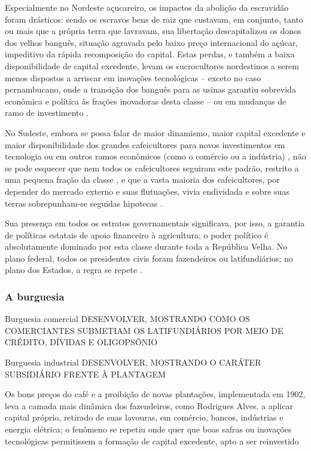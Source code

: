 Especialmente no Nordeste açucareiro, os impactos da abolição da escravidão foram drásticos: sendo os escravos bens de raiz que custavam, em conjunto, tanto ou mais que a própria terra que lavravam, sua libertação descapitalizou os donos dos velhos banguês, situação agravada pelo baixo preço internacional do açúcar, impeditivo da rápida recomposição do capital. Estas perdas, e também a baixa disponibilidade de capital excedente, levam os sucrocultores nordestinos a serem menos dispostos a arriscar em inovações tecnológicas -- exceto no caso pernambucano, onde a transição dos banguês para as usinas garantiu sobrevida econômica e política às frações inovadoras desta classe -- ou em mudanças de ramo de investimento \cite[p.~153]{CARONE1970inst}. 

No Sudeste, embora se possa falar de maior dinamismo, maior capital excedente e maior disponibilidade dos grandes cafeicultores para novos investimentos em tecnologia ou em outros ramos econômicos (como o comércio ou a indústria) \cite[p.~153-154]{CARONE1970inst}, não se pode esquecer que nem todos os cafeicultores seguiram este padrão, restrito a uma pequena fração da classe \cite[p.~32-38]{gorender_burguesia_1990}, e que a vasta maioria dos cafeicultores, por depender do mercado externo e suas flutuações, vivia endividada e sobre suas terras sobrepunham-se seguidas hipotecas \cite[p.~154]{CARONE1970inst}. 

Sua presença em todos os estratos governamentais significava, por isso, a garantia de políticas estatais de apoio financeiro à agricultura; o poder político é absolutamente dominado por esta classe durante toda a República Velha. No plano federal, todos os presidentes civis foram fazendeiros ou latifundiários; no plano dos Estados, a regra se repete \cite[p.~155]{CARONE1970inst}.

\subsubsection{A burguesia}\label{subsubsec:claburg}

Burguesia comercial DESENVOLVER, MOSTRANDO COMO OS COMERCIANTES SUBMETIAM OS LATIFUNDIÁRIOS POR MEIO DE CRÉDITO, DÍVIDAS E OLIGOPSÔNIO

Burguesia industrial DESENVOLVER, MOSTRANDO O CARÁTER SUBSIDIÁRIO FRENTE À PLANTAGEM

Os bons preços do café e a proibição de novas plantações, implementada em 1902, leva a camada mais dinâmica dos fazendeiros, como Rodrigues Alves, a aplicar capital próprio, retirado de suas lavouras, em comércio, bancos, indústrias e energia elétrica; o fenômeno se repetiu onde quer que boas safras ou inovações tecnológicas permitissem a formação de capital excedente, apto a ser reinvestido \cite[p.~147]{CARONE1970inst}

